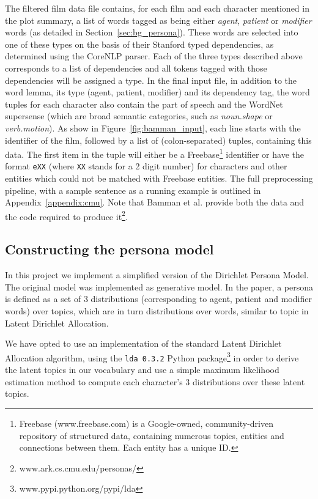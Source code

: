 \documentclass[bsc,frontabs,singlespacing,parskip, twoside]{infthesis}
\begin{document}
The filtered film data file contains, for each film and each character mentioned in the plot summary, a list of words tagged as being either \textit{agent}, \textit{patient} or \textit{modifier} words (as detailed in Section~\ref{sec:bg_persona}). These words are selected into one of these types on the basis of their Stanford typed dependencies, as determined using the CoreNLP parser. Each of the three types described above corresponds to a list of dependencies and all tokens tagged with those dependencies will be assigned a type. In the final input file, in addition to the word lemma, its type (agent, patient, modifier) and its dependency tag, the word tuples for each character also contain the part of speech and the WordNet supersense (which are broad semantic categories, such as \textit{noun.shape} or \textit{verb.motion}). As show in Figure~\ref{fig:bamman_input}, each line starts with the identifier of the film, followed by a list of (colon-separated) tuples, containing this data. The first item in the tuple will either be a Freebase\footnote{Freebase (www.freebase.com) is a Google-owned, community-driven repository of structured data, containing numerous topics, entities and connections between them. Each entity has a unique ID.} identifier or have the format \texttt{eXX} (where \texttt{XX} stands for a 2 digit number) for characters and other entities which could not be matched with Freebase entities. The full preprocessing pipeline, with a sample sentence as a running example is outlined in Appendix~\ref{appendix:cmu}. Note that Bamman et al. provide both the data and the code required to produce it\footnote{www.ark.cs.cmu.edu/personas/}.


\subsection{Constructing the persona model}
In this project we implement a simplified version of the Dirichlet Persona Model. The original model was implemented as generative model. In the paper, a persona is defined as a set of 3 distributions (corresponding to agent, patient and modifier words) over topics, which are in turn distributions over words, similar to topic in Latent Dirichlet Allocation.

We have opted to use an implementation of the standard Latent Dirichlet Allocation \cite{Blei2003} algorithm, using the \texttt{lda 0.3.2} Python package\footnote{ www.pypi.python.org/pypi/lda} in order to derive the latent topics in our vocabulary and use a simple maximum likelihood estimation method to compute each character's 3 distributions over these latent topics.
\end{document}
